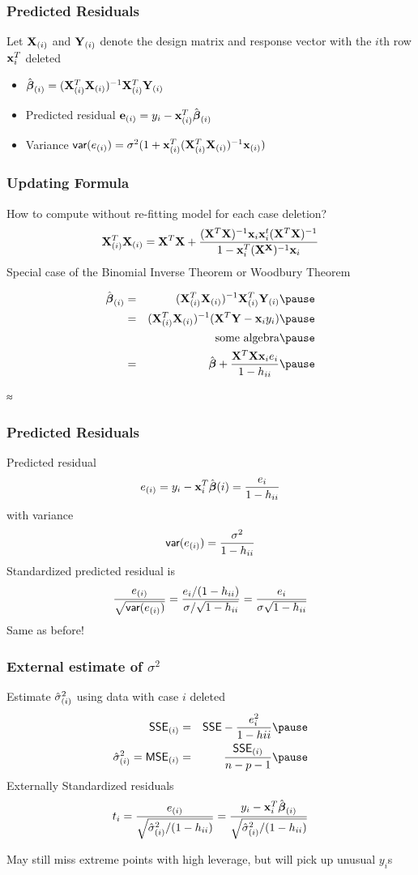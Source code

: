 \documentclass[]{beamer}
\begin{document}
  \begin{frame}
    \frametitle{Predicted Residuals}
    Let $\mathbf{X}_{(i)}$ and $\mathbf{Y}_{(i)}$ denote the design matrix and
    response vector with the $i$th row $\mathbf{x}_i^T$ deleted  \pause
    \begin{itemize}
\item       $\hat{\boldsymbol{\beta}}_{(i)} = (\mathbf{X}_{(i)}^T\mathbf{X}_{(i)})^{-1 }\mathbf{X}_{(i)}^T
  \mathbf{Y}_{(i)}$  \pause
\item Predicted residual $\mathbf{e}_{(i)}  = y_i - \mathbf{x}_{(i)}^T \hat{\boldsymbol{\beta}}_{(i)}$  \pause
\item Variance $\textsf{var}(e_{(i)}) = \sigma^2( 1 +
  \mathbf{x}_{(i)}^T(\mathbf{X}_{(i)}^T\mathbf{X}_{(i)})^{-1} \mathbf{x}_{(i)})$  \pause
    \end{itemize}

  \end{frame}
  \begin{frame}
    \frametitle{Updating Formula}
    How to compute without re-fitting model for each case deletion?  \pause
$$ \mathbf{X}_{(i)}^T \mathbf{X}_{(i)} = \mathbf{X}^T\mathbf{X} + \frac{(\mathbf{X}^T\mathbf{X})^{-1} \mathbf{x}_i \mathbf{x}_i^t
  (\mathbf{X}^T\mathbf{X})^{-1}}
{1 - \mathbf{x}_i^T (\mathbf{X}^{\mathbf{X}})^{-1} \mathbf{x}_i}$$  \pause
Special case of the Binomial Inverse Theorem or Woodbury Theorem  \pause

\begin{eqnarray*}
  \bhat_{(i)} & = & (\X_{(i)}^T\X_{(i)})^{-1 }\X_{(i)}^T
  \Y_{(i)}  \pause \\
 & = & (\X_{(i)}^T\X_{(i)})^{-1 }(\X^T\Y - \x_i y_i)  \pause \\
 &  & \text{ some algebra}  \pause \\
 & = & \bhat + \frac{ \X^T\X \x_i e_i}{ 1 - h_{ii}}   \pause
\end{eqnarray*}

≈

  \end{frame}
  \begin{frame}
    \frametitle{Predicted Residuals}
    Predicted residual
$$ e_{(i)} = y_i - \mathbf{x}_i^T \hat{\boldsymbol{\beta}}{(i)} = \frac{e_i}{1 - h_{ii}}$$
 \pause
with variance
$$\textsf{var}(e_{(i)}) = \frac{\sigma^2}{1 - h_{ii}}$$
 \pause
Standardized predicted residual is 
$$\frac{e_{(i)}}{\sqrt{\textsf{var}(e_{(i)})}}  = \frac{e_i/(1 -
  h_{ii})}{\sigma/\sqrt{1 - h_{ii}}} = \frac{e_i}{\sigma \sqrt{1 -
    h_{ii}} }
$$ \pause
Same as before!
  \end{frame}
  \begin{frame}
    \frametitle{External estimate of $\sigma^2$}
    Estimate ${\hat{\sigma}}^2_{(i)}$ using data with case $i$ deleted  \pause
    \begin{eqnarray*}
\SSE_{(i)} & = &  \SSE - \frac{e_i^2}{1 - h{ii}}  \pause \\
\shat_{(i)} = \MSE_{(i)} & = &  \frac{\SSE_{(i)}}{n - p - 1}  \pause\\
    \end{eqnarray*}
Externally Standardized residuals  \pause
$$t_i = \frac{e_{(i)}}{\sqrt{{\hat{\sigma}}^2_{(i)}/(1 - h_{ii})}}  =  \frac{y_i
  - \mathbf{x}_i^T \hat{\boldsymbol{\beta}}_{(i)}} {\sqrt{{\hat{\sigma}}^2_{(i)}/(1 - h_{ii})}}$$  \pause

May still miss extreme points with high leverage, but will pick up unusual $y_i$s
  \end{frame}
\end{document}
